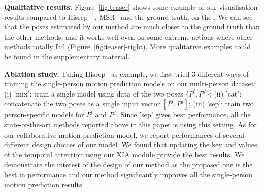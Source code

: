%
 

\noindent\textbf{Qualitative results.} 
Figure~\ref{fig:teaser} shows some example of our visualisation results compared to  Hisrep~\etal~\cite{mao2020history}, MSR~\cite{Dang_2021_ICCV} and the ground truth, on the . We can see that the poses estimated by our method are much closer to the ground truth than the other methods, and it works well even on some extreme actions where other methods totally fail (Figure~\ref{fig:teaser}-right). More qualitative examples could be found in the supplementary material.



\noindent\textbf{Ablation study.} 
Taking Hisrep~\cite{mao2020history} as example, we first tried 3 different ways of training the single-person motion prediction models on our multi-person dataset: (i) 'mix': train a single model using data of the two poses $\{P^l, P^f\}$; (ii) 'cat': concatenate the two poses as a single input vector $[P^l, P^f]$; (iii) 'sep': train two person-specific models for ${P^l}$ and ${P^f}$. Since 'sep' gives best performance, all the state-of-the-art methods reported above in this paper is using this setting.
As for our collaborative motion prediction model, we report performances of several different design choices of our model. We found that updating the key and values of the temporal attention using our XIA module provide the best results.
We demonstrate the interest of the design of our method as the proposed one is the best in performance and our method significantly improves all the single-person motion prediction results.